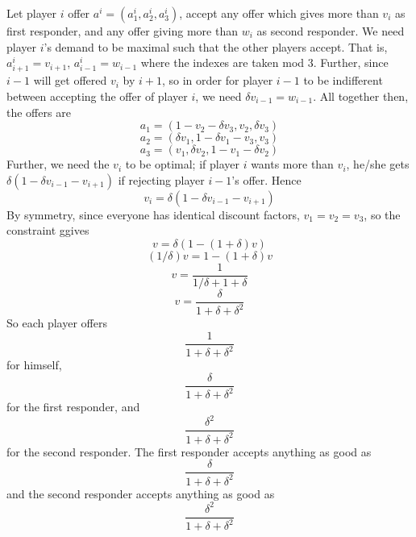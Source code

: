 \documentclass[10pt,letter]{article}
\begin{document}
Let player $i$ offer $a^i = (a^i_1, a^i_2, a^i_3)$, accept any offer which gives more than $v_i$ as first responder, and any offer giving more than $w_i$ as second responder. We need player $i$'s demand to be maximal such that the other players accept. That is, $a^i_{i+1} = v_{i+1}$, $a^i_{i-1} = w_{i-1}$ where the indexes are taken mod 3. Further, since $i-1$ will get offered $v_i$ by $i+1$, so in order for player $i-1$ to be indifferent between accepting the offer of player $i$, we need $\delta v_{i-1} = w_{i-1} $. All together then, the offers are
\[ a_1 = (1-v_2 - \delta v_3, v_2, \delta v_3) \]
\[ a_2 = (\delta v_1, 1-\delta v_1-v_3, v_3) \]
\[ a_3 = (v_1, \delta v_2, 1-v_1-\delta v_2) \]
Further, we need the $v_i$ to be optimal; if player $i$ wants more than $v_i$, he/she gets $\delta(1-\delta v_{i-1}-v_{i+1})$ if rejecting player $i-1$'s offer. Hence
\[ v_i = \delta(1-\delta v_{i-1}-v_{i+1}) \]
By symmetry, since everyone has identical discount factors, $v_1 = v_2 = v_3$, so the constraint ggives
\[ v = \delta(1 - (1+\delta) v ) \]
\[ (1/\delta) v = 1 - (1+\delta)v \]
\[  v = \frac{1}{1/\delta + 1 + \delta } \]
\[  v = \frac{\delta}{1+ \delta + \delta^2 } \]
So each player offers
\[ \frac{1}{1+\delta + \delta^2} \]
for himself,
\[ \frac{\delta}{1+\delta + \delta^2} \]
for the first responder, and
\[ \frac{\delta^2}{1+\delta + \delta^2} \]
for the second responder. The first responder accepts anything as good as
\[ \frac{\delta}{1+\delta + \delta^2} \]
and the second responder accepts anything as good as
\[ \frac{\delta^2}{1+\delta + \delta^2} \]
\end{document}
